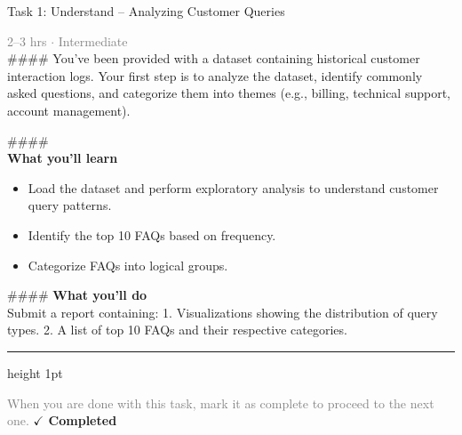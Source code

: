 \documentclass[10pt,a4paper]{article}
\begin{document}
\begin{taskbox}{Task 1: Understand – Analyzing Customer Queries}

    {\small \textcolor{gray}{2--3 hrs $\cdot$ Intermediate}}\\[12pt]

    \#\#\#\# 
You’ve been provided with a dataset containing historical customer interaction logs. Your first step is to analyze the dataset, identify commonly asked questions, and categorize them into themes (e.g., billing, technical support, account management).

\#\#\#\# \\[10pt]
\vspace{8pt}
{\large \textbf{\textcolor{brandLight}{What you'll learn}}}\\[4pt]
\begin{itemize}
    \item Load the dataset and perform exploratory analysis to understand customer query patterns.
    \item Identify the top 10 FAQs based on frequency.
    \item Categorize FAQs into logical groups.
\end{itemize}

\#\#\#\# \vspace{8pt}
{\large \textbf{\textcolor{brandLight}{What you'll do}}}\\[4pt]
Submit a report containing:
1. Visualizations showing the distribution of query types.
2. A list of top 10 FAQs and their respective categories.\par

    \vspace{16pt}

    \textcolor{cardBorder}{\hrule height 1pt}\vspace{8pt}

    \small \textcolor{gray}{When you are done with this task, mark it as complete to proceed to the next one.} \hfill \textbf{\textcolor{brandDark}{$\checkmark$ Completed}}

\end{taskbox}
\end{document}
